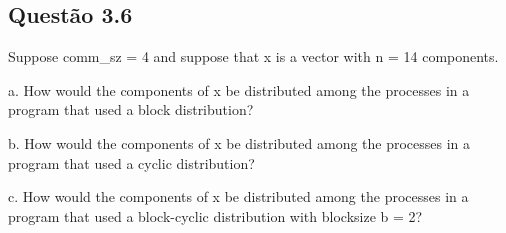

\subsection{Questão 3.6}

Suppose comm\_sz = 4 and suppose that x is a vector with n = 14 components.

a. How would the components of x be distributed among the processes in a program that used a block distribution?

b. How would the components of x be distributed among the processes in a program that used a cyclic distribution?

c. How would the components of x be distributed among the processes in a program that used a block-cyclic distribution with blocksize b = 2?

